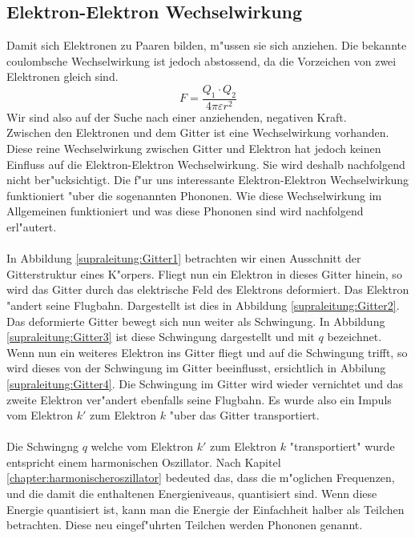 \begin{refsection}
\section{Elektron-Elektron Wechselwirkung\label{supraleitung:elektronelektronwecheslwirkung}}
Damit sich Elektronen zu Paaren bilden, m"ussen sie sich anziehen. Die bekannte coulombsche Wechselwirkung ist jedoch abstossend, da die Vorzeichen von zwei Elektronen gleich sind.
\begin{equation}
F = \frac{Q_1\cdot Q_2}{4\pi \varepsilon r^2}
\label{supraleitung:Coulomb}
\end{equation}
Wir sind also auf der Suche nach einer anziehenden, negativen Kraft.
\\
Zwischen den Elektronen und dem Gitter ist eine Wechselwirkung vorhanden. Diese reine Wechselwirkung zwischen Gitter und Elektron hat jedoch keinen Einfluss auf die Elektron-Elektron Wechselwirkung. Sie wird deshalb nachfolgend nicht ber"ucksichtigt.
Die f"ur uns interessante Elektron-Elektron Wechselwirkung funktioniert "uber die sogenannten Phononen. Wie diese Wechselwirkung im Allgemeinen funktioniert und was diese Phononen sind wird nachfolgend erl"autert.
\\
\\
In Abbildung \ref{supraleitung:Gitter1} betrachten wir einen Ausschnitt der Gitterstruktur eines K"orpers. Fliegt nun ein Elektron in dieses Gitter hinein, so wird das Gitter durch das elektrische Feld des Elektrons deformiert. Das Elektron "andert seine Flugbahn. Dargestellt ist dies in Abbildung \ref{supraleitung:Gitter2}. Das deformierte Gitter bewegt sich nun weiter als Schwingung. In Abbildung \ref{supraleitung:Gitter3} ist diese Schwingung dargestellt und mit $q$ bezeichnet. Wenn nun ein weiteres Elektron ins Gitter fliegt und auf die Schwingung trifft, so wird dieses von der Schwingung im Gitter beeinflusst, ersichtlich in Abbilung \ref{supraleitung:Gitter4}. Die Schwingung im Gitter wird wieder vernichtet und das zweite Elektron ver"andert ebenfalls seine Flugbahn. Es wurde also ein Impuls vom Elektron $k'$ zum Elektron $k$ "uber das Gitter transportiert. 
\\
\\
Die Schwingng $q$ welche vom Elektron $k'$ zum Elektron $k$ "transportiert" wurde entspricht einem harmonischen Oszillator. Nach Kapitel \ref{chapter:harmonischeroszillator} bedeuted das, dass die m"oglichen Frequenzen, und die damit die enthaltenen Energieniveaus, quantisiert sind. Wenn diese Energie quantisiert ist, kann man die Energie der Einfachheit halber als Teilchen betrachten. Diese neu eingef"uhrten Teilchen werden Phononen genannt.\\

\end{refsection}
